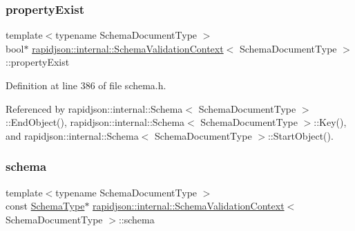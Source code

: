 \mbox{\label{structrapidjson_1_1internal_1_1_schema_validation_context_a4faf6b9b5d50a677792b462a16bb14a1}} 
\subsubsection{\texorpdfstring{propertyExist}{propertyExist}}
{\footnotesize\ttfamily template$<$typename Schema\+Document\+Type $>$ \\
bool$\ast$ \mbox{\hyperlink{structrapidjson_1_1internal_1_1_schema_validation_context}{rapidjson\+::internal\+::\+Schema\+Validation\+Context}}$<$ Schema\+Document\+Type $>$\+::property\+Exist}



Definition at line 386 of file schema.\+h.



Referenced by rapidjson\+::internal\+::\+Schema$<$ Schema\+Document\+Type $>$\+::\+End\+Object(), rapidjson\+::internal\+::\+Schema$<$ Schema\+Document\+Type $>$\+::\+Key(), and rapidjson\+::internal\+::\+Schema$<$ Schema\+Document\+Type $>$\+::\+Start\+Object().

\mbox{\label{structrapidjson_1_1internal_1_1_schema_validation_context_a20a1543637d494e7d8727051448ec2af}} 
\subsubsection{\texorpdfstring{schema}{schema}}
{\footnotesize\ttfamily template$<$typename Schema\+Document\+Type $>$ \\
const \mbox{\hyperlink{structrapidjson_1_1internal_1_1_schema_validation_context_ae7fc7012fdcdb1b0141b73842c814644}{Schema\+Type}}$\ast$ \mbox{\hyperlink{structrapidjson_1_1internal_1_1_schema_validation_context}{rapidjson\+::internal\+::\+Schema\+Validation\+Context}}$<$ Schema\+Document\+Type $>$\+::schema}



